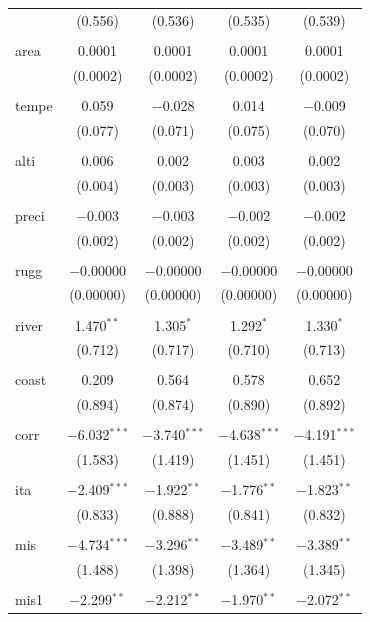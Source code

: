 \documentclass[
  a4paper,
]{article}
\begin{document}
\begin{center}
{\begin{tabular}{@{\extracolsep{5pt}}lcccc}
  & (0.556) & (0.536) & (0.535) & (0.539) \\ 
  & & & & \\ 
 area & 0.0001 & 0.0001 & 0.0001 & 0.0001 \\ 
  & (0.0002) & (0.0002) & (0.0002) & (0.0002) \\ 
  & & & & \\ 
 tempe & 0.059 & $-$0.028 & 0.014 & $-$0.009 \\ 
  & (0.077) & (0.071) & (0.075) & (0.070) \\ 
  & & & & \\ 
 alti & 0.006 & 0.002 & 0.003 & 0.002 \\ 
  & (0.004) & (0.003) & (0.003) & (0.003) \\ 
  & & & & \\ 
 preci & $-$0.003 & $-$0.003 & $-$0.002 & $-$0.002 \\ 
  & (0.002) & (0.002) & (0.002) & (0.002) \\ 
  & & & & \\ 
 rugg & $-$0.00000 & $-$0.00000 & $-$0.00000 & $-$0.00000 \\ 
  & (0.00000) & (0.00000) & (0.00000) & (0.00000) \\ 
  & & & & \\ 
 river & 1.470$^{**}$ & 1.305$^{*}$ & 1.292$^{*}$ & 1.330$^{*}$ \\ 
  & (0.712) & (0.717) & (0.710) & (0.713) \\ 
  & & & & \\ 
 coast & 0.209 & 0.564 & 0.578 & 0.652 \\ 
  & (0.894) & (0.874) & (0.890) & (0.892) \\ 
  & & & & \\ 
 corr & $-$6.032$^{***}$ & $-$3.740$^{***}$ & $-$4.638$^{***}$ & $-$4.191$^{***}$ \\ 
  & (1.583) & (1.419) & (1.451) & (1.451) \\ 
  & & & & \\ 
 ita & $-$2.409$^{***}$ & $-$1.922$^{**}$ & $-$1.776$^{**}$ & $-$1.823$^{**}$ \\ 
  & (0.833) & (0.888) & (0.841) & (0.832) \\ 
  & & & & \\ 
 mis & $-$4.734$^{***}$ & $-$3.296$^{**}$ & $-$3.489$^{**}$ & $-$3.389$^{**}$ \\ 
  & (1.488) & (1.398) & (1.364) & (1.345) \\ 
  & & & & \\ 
 mis1 & $-$2.299$^{**}$ & $-$2.212$^{**}$ & $-$1.970$^{**}$ & $-$2.072$^{**}$ \\ 

\end{tabular}}
\end{center}
\end{document}
